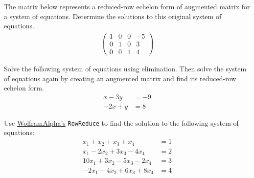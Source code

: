 \documentclass[11pt,letterpaper]{article}
\begin{document}
\newpage



 The matrix below represents a reduced-row echelon form of augmented matrix for a system of equations. Determine the solutions to this original system of equations. 
	\[
	\begin{aligned}
	\begin{pmatrix}
	1 & 0 & 0 & -5 \\
	0 & 1 & 0 & 3 \\
	0 & 0 & 1 & 4
	\end{pmatrix}
	\end{aligned}
	\]



\newpage



 Solve the following system of equations using elimination. Then solve the system of equations again by creating an augmented matrix and find its reduced-row echelon form.
	\[
	\begin{aligned}
	x - 3y&= -9 \\
	-2x + y&= 8
	\end{aligned}
	\]



\newpage



 Use \href{https://www.wolframalpha.com/}{WolframAlpha's} \texttt{RowReduce} to find the solution to the following system of equations: 
	\[
	\begin{aligned}
	x_1 + x_2 + x_3 + x_4&= 1 \\
	x_1 - 2x_2 + 3x_3 - 4x_4&= 2 \\
	10x_1 + 3x_2 - 5x_3 - 2x_4&= 3 \\
	-2x_1 - 4x_2 + 6x_3 + 8x_4&= 4
	\end{aligned}
	\]
\end{document}
